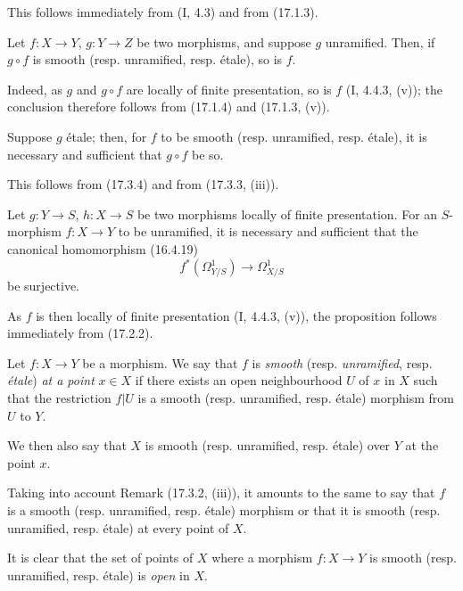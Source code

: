 This follows immediately from (I, 4.3) and from (17.1.3).

\begin{proposition}[17.3.4]
\label{IV.17.3.4}
Let $f:X\to Y$, $g:Y\to Z$ be two morphisms, and suppose $g$ unramified. Then, if $g\circ f$ is smooth (resp. unramified, resp. étale), so is $f$.
\end{proposition}

Indeed, as $g$ and $g\circ f$ are locally of finite presentation, so is $f$ (I, 4.4.3, (v)); the conclusion therefore follows from (17.1.4) and (17.1.3, (v)).

\begin{corollary}[17.3.5]
\label{IV.17.3.5}
Suppose $g$ étale; then, for $f$ to be smooth (resp. unramified, resp. étale), it is necessary and sufficient that $g\circ f$ be so.
\end{corollary}

This follows from (17.3.4) and from (17.3.3, (iii)).

\begin{proposition}[17.3.6]
\label{IV.17.3.6}
Let $g:Y\to S$, $h:X\to S$ be two morphisms locally of finite presentation. For an $S$-morphism $f:X\to Y$ to be unramified, it is necessary and sufficient that the canonical homomorphism (16.4.19)
\[
  f^*(\Omega_{Y/S}^1)\longrightarrow\Omega_{X/S}^1
\]
be surjective.
\end{proposition}

As $f$ is then locally of finite presentation (I, 4.4.3, (v)), the proposition follows immediately from (17.2.2).

\begin{definition}[17.3.7]\label{IV.17.3.7}
Let $f:X\to Y$ be a morphism. We say that $f$ is \emph{smooth} (resp. \emph{unramified}, resp. \emph{étale}) \emph{at a point} $x\in X$ if there exists an open neighbourhood $U$ of $x$ in $X$ such that the restriction $f|U$ is a smooth (resp. unramified, resp. étale) morphism from $U$ to $Y$.
\end{definition}

We then also say that $X$ is smooth (resp. unramified, resp. étale) over $Y$ at the point $x$.

Taking into account Remark (17.3.2, (iii)), it amounts to the same to say that $f$ is a smooth (resp. unramified, resp. étale) morphism or that it is smooth (resp. unramified, resp. étale) at every point of $X$.

It is clear that the set of points of $X$ where a morphism $f:X\to Y$ is smooth (resp. unramified, resp. étale) is \emph{open} in $X$.

